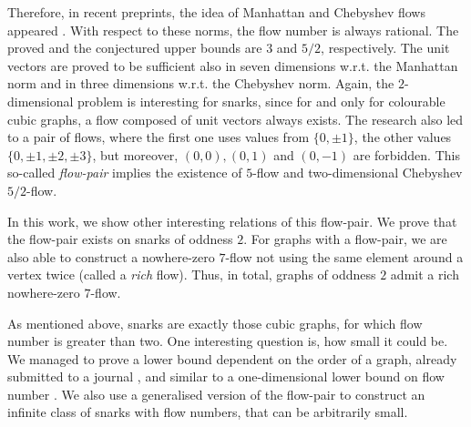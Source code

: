 Therefore, in recent preprints, the idea of Manhattan and Chebyshev flows appeared \cite{preprint, p-norm_flows}. With respect to these norms, the flow number is always rational. The proved and the conjectured upper bounds are $3$ and $5/2$, respectively. The unit vectors are proved to be sufficient also in seven dimensions w.r.t. the Manhattan norm and in three dimensions w.r.t. the Chebyshev norm. Again, the $2$-dimensional problem is interesting for snarks, since for and only for colourable cubic graphs, a flow composed of unit vectors always exists. The research also led to a pair of flows, where the first one uses values from $\{0, \pm 1\}$, the other values $\{0, \pm 1, \pm 2, \pm 3\}$, but moreover, $(0,0), (0,1)$ and $(0,-1)$ are forbidden. This so-called \emph{flow-pair} implies the existence of $5$-flow and two-dimensional Chebyshev $5/2$-flow.

In this work, we show other interesting relations of this flow-pair. We prove that the flow-pair exists on snarks of oddness $2$. For graphs with a flow-pair, we are also able to construct a nowhere-zero $7$-flow not using the same element around a vertex twice (called a \emph{rich} flow). Thus, in total, graphs of oddness $2$ admit a rich nowhere-zero $7$-flow.

As mentioned above, snarks are exactly those cubic graphs, for which flow number is greater than two. One interesting question is, how small it could be. We managed to prove a lower bound dependent on the order of a graph, already submitted to a journal \cite{preprint}, and similar to a one-dimensional lower bound on flow number \cite{cycle_rank}. We also use a generalised version of the flow-pair to construct an infinite class of snarks with flow numbers, that can be arbitrarily small.